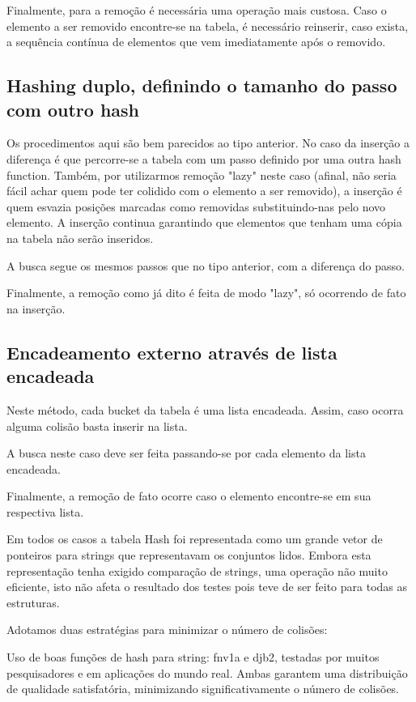 \documentclass[twoside]{article}
\begin{document}
\begin{multicols}{2}
\indent Finalmente, para a remoção é necessária uma operação mais custosa. Caso o elemento a ser removido encontre-se na tabela, é necessário reinserir, caso exista, a sequência contínua de elementos que vem imediatamente após o removido.

\subsection{ Hashing duplo, definindo o tamanho do passo com outro hash }
\indent Os procedimentos aqui são bem parecidos ao tipo anterior. No caso da inserção a diferença é que percorre-se a tabela com um passo definido por uma outra hash function. Também, por utilizarmos remoção "lazy" neste caso (afinal, não seria fácil achar quem pode ter colidido com o elemento a ser removido), a inserção é quem esvazia posições marcadas como removidas substituindo-nas pelo novo elemento. A inserção continua garantindo que elementos que tenham uma cópia na tabela não serão inseridos.

\indent A busca segue os mesmos passos que no tipo anterior, com a diferença do passo.

\indent Finalmente, a remoção como já dito é feita de modo "lazy", só ocorrendo de fato na inserção.

\subsection{ Encadeamento externo através de lista encadeada }
\indent Neste método, cada bucket da tabela é uma lista encadeada. Assim, caso ocorra alguma colisão basta inserir na lista.
 
\indent A busca neste caso deve ser feita passando-se por cada elemento da lista encadeada.

\indent Finalmente, a remoção de fato ocorre caso o elemento encontre-se em sua respectiva lista.

\indent Em todos os casos a tabela Hash foi representada como um grande vetor de ponteiros para strings que representavam os conjuntos lidos. Embora esta representação tenha exigido comparação de strings, uma operação não muito eficiente, isto não afeta o resultado dos testes pois teve de ser feito para todas as estruturas. 

Adotamos duas estratégias para minimizar o número de colisões:
\begin{compactitem}
\item Uso de boas funções de hash para string: 
   fnv1a e djb2, testadas por muitos pesquisadores e em aplicações do mundo real. Ambas garantem uma distribuição de qualidade satisfatória, minimizando significativamente o número de colisões.


\end{compactitem}
\end{multicols}
\end{document}
